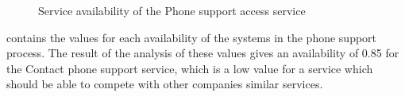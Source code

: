 \begin{center}
	\begin{figure}[H]
		\centering
		\setlength\fboxsep{7pt}
		\setlength\fboxrule{0.5pt}
		\caption{Service availability of the Phone support access service}
		\label{fig:map_support_phone_availability}
	\end{figure}
\end{center}
 contains the values for each availability of the systems in the phone support process. The result of the analysis of these values gives an availability of 0.85 for the Contact phone support service, which is a low value for a service which should be able to compete with other companies similar services.
